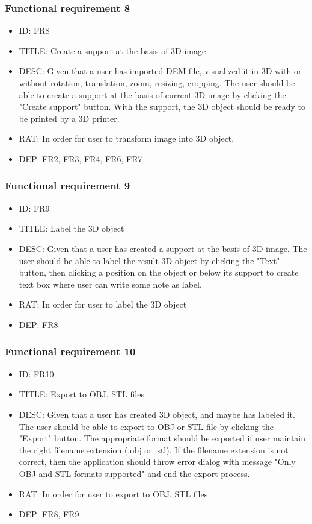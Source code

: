 \documentclass[11pt]{article}
\begin{document}
\subsubsection{Functional requirement 8}
\begin{itemize}
\item ID: FR8
\item TITLE: Create a support at the basis of 3D image
\item DESC: Given that a user has imported DEM file, visualized it in 3D with or without rotation, translation, zoom, resizing, cropping. The user should be able to create a support at the basis of current 3D image by clicking the "Create support" button. With the support, the 3D object should be ready to be printed by a 3D printer.
\item RAT: In order for user to transform image into 3D object.
\item DEP: FR2, FR3, FR4, FR6, FR7
\end{itemize}
\subsubsection{Functional requirement 9}
\begin{itemize}
\item ID: FR9
\item TITLE: Label the 3D object
\item DESC: Given that a user has created a support at the basis of 3D image. The user should be able to label the result 3D object by clicking the "Text" button, then clicking a position on the object or below its support to create text box where user can write some note as label.
\item RAT: In order for user to label the 3D object
\item DEP: FR8
\end{itemize}
\subsubsection{Functional requirement 10}
\begin{itemize}
\item ID: FR10
\item TITLE: Export to OBJ, STL files
\item DESC: Given that a user has created 3D object, and maybe has labeled it. The user should be able to export to OBJ or STL file by clicking the "Export" button. The appropriate format should be exported if user maintain the right filename extension (.obj or .stl). If the filename extension is not correct, then the application should throw error dialog with message "Only OBJ and STL formats supported" and end the export process.
\item RAT: In order for user to export to OBJ, STL files
\item DEP: FR8, FR9
\end{itemize}
\end{document}
